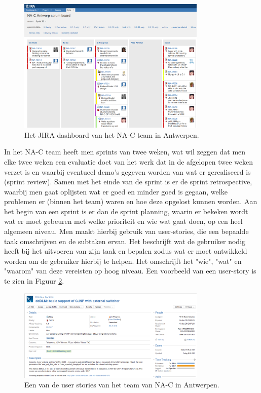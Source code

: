 \documentclass[10pt,a4paper]{article}
\begin{document}
\begin{figure}[ht!]
\centering
\includegraphics[width=90mm]{CaptureJira.png}
\caption{Het JIRA dashboard van het NA-C team in Antwerpen.} 
\label{jira}
\end{figure}

In het NA-C team heeft men sprints van twee weken, wat wil zeggen dat men elke twee weken een evaluatie doet van het werk dat in de afgelopen twee weken verzet is en waarbij eventueel demo's gegeven worden van wat er gerealiseerd is (sprint review). Samen met het einde van de sprint is er de sprint retrospective, waarbij men gaat oplijsten wat er goed en minder goed is gegaan, welke problemen er (binnen het team) waren en hoe deze opgelost kunnen worden. Aan het begin van een sprint  is er dan de sprint planning, waarin er bekeken wordt wat er moet gebeuren met welke prioriteit en wie wat gaat doen, op een heel algemeen niveau. Men maakt hierbij gebruik van user-stories, die een bepaalde taak omschrijven en de subtaken ervan. Het beschrijft wat de gebruiker nodig heeft bij het uitvoeren van zijn taak en bepalen zodus wat er moet ontwikkeld worden om de gebruiker hierbij te helpen. Het omschrijft het "wie", "wat" en "waarom" van deze vereisten op hoog niveau. Een voorbeeld van een user-story is te zien in Figuur \ref{user_story}.

\begin{figure}[ht!]
\centering
\includegraphics[width=90mm]{user_story.png}
\caption{Een van de user stories van het team van NA-C in Antwerpen.} 
\label{user_story}
\end{figure}
\end{document}
